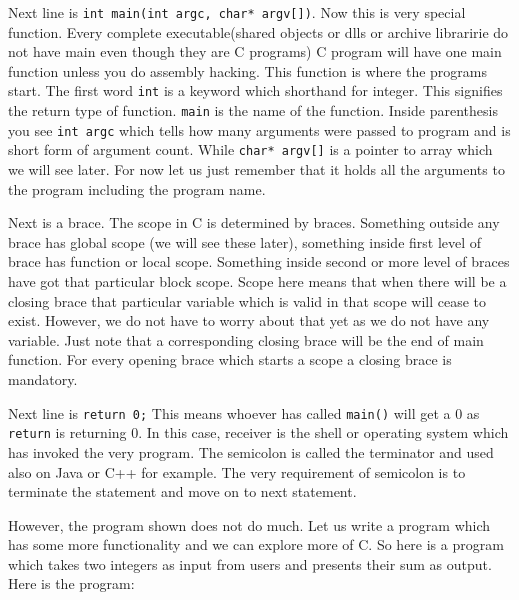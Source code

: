 Next line is \texttt{int main(int argc, char* argv[])}. Now this is very special
function. Every complete executable(shared objects or dlls or archive
libraririe do not have main even though they are C programs) C program will
have one main function unless you do assembly hacking. This function is where
the programs start. The first word \texttt{int} is a keyword which shorthand
for integer. This signifies the return type of function. \texttt{main} is the
name of the function. Inside parenthesis you see \texttt{int argc} which tells
how many arguments were passed to program and is short form of argument
count. While \texttt{char* argv[]} is a pointer to array which we will see
later. For now let us just remember that it holds all the arguments to the
program including the program name.

Next is a brace. The scope in C is determined by braces. Something outside any
brace has global scope (we will see these later), something inside first level
of brace has function or local scope. Something inside second or more level of
braces have got that particular block scope. Scope here means that when there
will be a closing brace that particular variable which is valid in that scope
will cease to exist. However, we do not have to worry about that yet as we do
not have any variable. Just note that a corresponding closing brace will be the
end of main function. For every opening brace which starts a scope a closing
brace is mandatory.

Next line is \texttt{return 0;} This means whoever has called \texttt{main()}
will get a 0 as \texttt{return} is returning 0. In this case, receiver is the
shell or operating system 
which has invoked the very program. The semicolon is called the terminator and
used also on Java or C++ for example. The very requirement of semicolon is to
terminate the statement and move on to next statement.

However, the program shown does not do much. Let us write a program which has
some more functionality and we can explore more of C. So here is a program
which takes two integers as input from users and presents their sum as
output. Here is the program:

